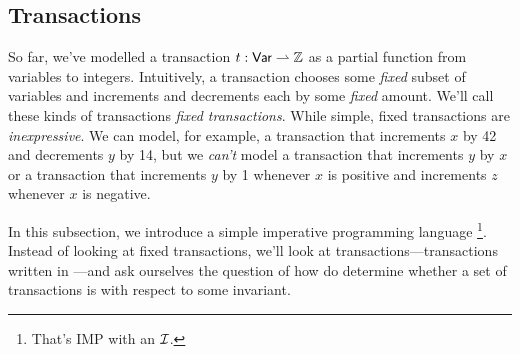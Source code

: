 \subsection{\imp{} Transactions}\label{sec:imptxns}
So far, we've modelled a transaction $t: \textsf{Var} \rightharpoonup \mathbb{Z}$ as a
partial function from variables to integers. Intuitively, a transaction chooses
some \emph{fixed} subset of variables and increments and decrements each by
some \emph{fixed} amount. We'll call these kinds of transactions \emph{fixed
transactions}. While simple, fixed transactions are \emph{inexpressive}. We can
model, for example, a transaction that increments $x$ by 42 and decrements $y$
by 14, but we \emph{can't} model a transaction that increments $y$ by $x$ or a
transaction that increments $y$ by 1 whenever $x$ is positive and increments
$z$ whenever $x$ is negative.

In this subsection, we introduce a simple imperative programming language
\imp{}\footnote{That's IMP \cite{winskel1993formal} with an $\mathcal{I}{}$.}.
Instead of looking at fixed transactions, we'll look at \imp{}
transactions---transactions written in \imp{}---and ask ourselves the question
of how do determine whether a set of \imp{} transactions is \iconfluent{} with
respect to some invariant.

